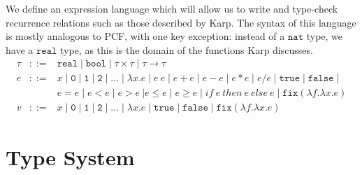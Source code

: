 We define an expression language which will allow us to write and type-check recurrence relations such as 
those described by Karp. The syntax of this language is mostly analogous to PCF, with one key exception: instead of a 
$\texttt{nat}$ type, we have a $\texttt{real}$ type, as this is the domain of the functions Karp discusses. \\ 
\[
\begin{array}{rcl}
\tau &::=& \texttt{real} \mid \texttt{bool} \mid \tau \times \tau \mid \tau \rightarrow \tau \\
e &::=& x  \mid \texttt{0} \mid \texttt{1} \mid \texttt{2} \mid \dotsc \mid \lambda x.e \mid e \ e \mid e + e \mid e - e \mid  e  *  e \mid e / e \mid \texttt{true} \mid \texttt{false} \mid \\
  && e  =  e \mid e < e \mid e > e \ | e \leq e \mid e \geq e \mid 
     if \ e \ then \ e \ else \ e \mid \texttt{fix} (\lambda f.\lambda x.e) \\
v &::=& x  \mid \texttt{0} \mid \texttt{1} \mid \texttt{2} \mid \dotsc \mid \lambda x.e \mid \texttt{true} \mid \texttt{false} \mid \texttt{fix} (\lambda f.\lambda x.e)
\end{array}
\]

\section{Type System}

